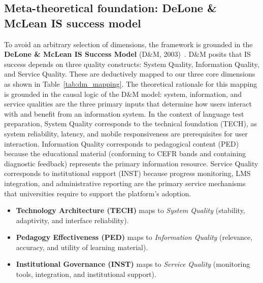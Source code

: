 \documentclass[11pt,a4paper]{article}
\begin{document}
\subsection{Meta-theoretical foundation: DeLone \& McLean IS success model}

To avoid an arbitrary selection of dimensions, the framework is grounded in the \textbf{DeLone \& McLean IS Success Model} (D\&M, 2003)~\cite{b31}. D\&M posits that IS success depends on three quality constructs: System Quality, Information Quality, and Service Quality. These are deductively mapped to our three core dimensions as shown in Table~\ref{tab:dm_mapping}. The theoretical rationale for this mapping is grounded in the causal logic of the D\&M model: system, information, and service qualities are the three primary inputs that determine how users interact with and benefit from an information system. In the context of language test preparation, System Quality corresponds to the technical foundation (TECH), as system reliability, latency, and mobile responsiveness are prerequisites for user interaction. Information Quality corresponds to pedagogical content (PED) because the educational material (conforming to CEFR bands and containing diagnostic feedback) represents the primary information resource. Service Quality corresponds to institutional support (INST) because progress monitoring, LMS integration, and administrative reporting are the primary service mechanisms that universities require to support the platform's adoption.
\begin{itemize}
  \item \textbf{Technology Architecture (TECH)} maps to \textit{System Quality} (stability, adaptivity, and interface reliability).
  \item \textbf{Pedagogy Effectiveness (PED)} maps to \textit{Information Quality} (relevance, accuracy, and utility of learning material).
  \item \textbf{Institutional Governance (INST)} maps to \textit{Service Quality} (monitoring tools, integration, and institutional support).
\end{itemize}
\end{document}
